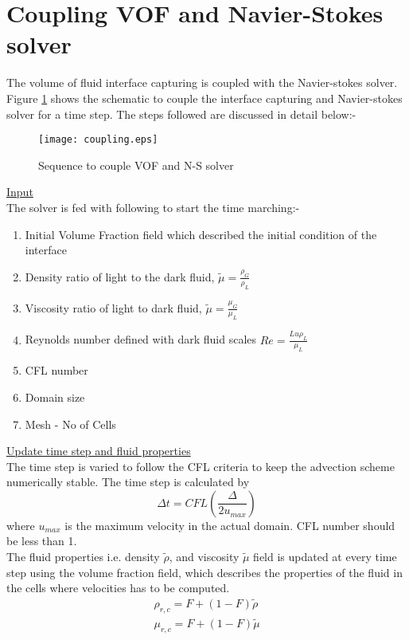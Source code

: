 \section{Coupling VOF and Navier-Stokes solver}
The volume of fluid interface capturing is coupled with the Navier-stokes solver. Figure \ref{Fig:coupling} shows the schematic to couple the interface capturing and Navier-stokes
solver for a time step. The steps followed are discussed in detail below:-
\begin{figure}
 \centering
 \texttt{[image: coupling.eps]}
 \caption{Sequence to couple VOF and N-S solver}
 \label{Fig:coupling}
\end{figure}

\underline{Input}\\
The solver is fed with following to start the time marching:-
\begin{enumerate}
 \item Initial Volume Fraction field which described the initial condition of the interface
 \item Density ratio of light to the dark fluid, $\tilde\mu = \frac{\rho_G}{\rho_L}$ %
 \item Viscosity ratio of light to dark fluid, $\tilde\mu = \frac{\mu_G}{\mu_L}$
 \item Reynolds number defined with dark fluid scales $Re = \frac{Lu\rho_L}{\mu_L}$
 \item CFL number
 \item Domain size
 \item Mesh - No of Cells
\end{enumerate}
\underline{Update time step and fluid properties}\\
The time step is varied to follow the CFL criteria to keep the advection scheme numerically stable. The time step is calculated by
\begin{equation}
 \Delta t = CFL\left(\frac{\Delta}{2u_{max}}\right)
\end{equation}
where $u_{max}$ is the maximum velocity in the actual domain. CFL number should be less than 1.\\
The fluid properties i.e. density $\tilde\rho$, and viscosity $\tilde\mu$ field is updated at every time step using the volume fraction field, which describes the properties
of the fluid in the cells where velocities has to be computed.
\begin{eqnarray}
 \rho_{r,c} = F + (1-F)\tilde\rho  \nonumber \\
 \mu_{r,c} = F + (1-F)\tilde\mu 
\end{eqnarray}

